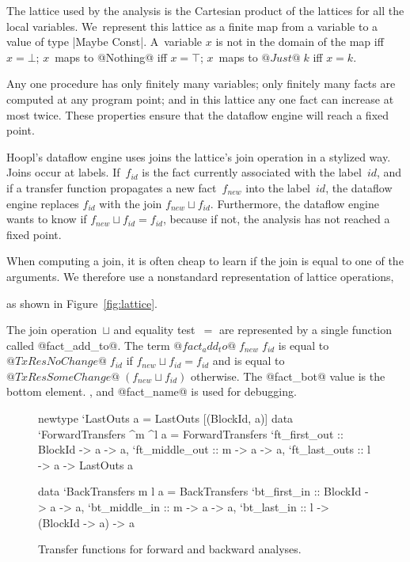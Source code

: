 \documentclass[blockstyle,preprint,natbib,nocopyrightspace]{sigplanconf}
\newcommand\ourlib{Hoopl}  %
\newcommand\join{\sqcup}
\newcommand\figref[1]{Figure~\ref{fig:#1}}
\newcommand\figlabel[1]{\label{fig:#1}}
\begin{document}
The lattice used by the analysis is the Cartesian product of the
lattices for all the local variables.
We~represent this lattice as a finite map from a variable
to a value of type \icode|Maybe Const|.
A~variable $x$ is not in the domain of the map iff $x=\bot$;
$x$~maps to @Nothing@ iff $x=\top$; $x$~maps to $@Just@\;k$ iff
$x=k$.


\ifcutting\else
Any one procedure has only finitely many variables;
only finitely many facts are computed at any program point;
and in this lattice any one fact can increase at most twice.
These properties
ensure that the dataflow engine will
reach a fixed point.
\fi


\ourlib's dataflow engine uses
\ifcutting joins
\else the lattice's join operation
\fi in a stylized way.
Joins occur at labels.
If~$f_{\mathit{id}}$ is the fact currently associated with the
label~$\mathit{id}$, 
and if a transfer function propagates a new fact~$f_{\mathit{new}}$
into the label~$\mathit{id}$, 
the dataflow engine replaces $f_{\mathit{id}}$ with
the join  $f_{\mathit{new}} \join f_{\mathit{id}}$.
Furthermore, the dataflow engine wants to know if
  $f_{\mathit{new}} \join f_{\mathit{id}} = f_{\mathit{id}}$,
because if not, the analysis has not reached a fixed point.



When computing a join, 
it is often cheap to learn if the join
is equal to one of the arguments.
We therefore use a nonstandard representation of lattice operations,
\iffalse
(\figref{lattice}).
\else
as shown in \figref{lattice}.
\fi
The join operation~$\join$ and equality test~$=$ are represented by a
single function called @fact_add_to@.
The term $@fact_add_to@\;f_{\mathit{new}}\;f_{\mathit{id}}$ is equal to
$@TxRes NoChange@\; f_{\mathit{id}}$ if $f_{\mathit{new}} \join f_{\mathit{id}} = f_{\mathit{id}}$
and is equal to
$@TxRes SomeChange@\; (f_{\mathit{new}} \join f_{\mathit{id}})$ otherwise.
The @fact_bot@ value is the bottom element\ifcutting.
\else, 
and @fact_name@  is used for debugging.
\fi

\begin{figure}
\begin{code}
newtype `LastOuts a = LastOuts [(BlockId, a)]
data `ForwardTransfers ^m ^l a = ForwardTransfers
 {`ft_first_out  :: BlockId -> a -> a,
  `ft_middle_out :: m       -> a -> a,
  `ft_last_outs  :: l       -> a -> LastOuts a} 

data `BackTransfers m l a = BackTransfers
 {`bt_first_in  :: BlockId -> a              -> a,
  `bt_middle_in :: m       -> a              -> a,
  `bt_last_in   :: l       -> (BlockId -> a) -> a} 
\end{code}
\caption{Transfer functions for forward and backward analyses.}
\figlabel{transfers}
\ifpagetuning\vspace*{-1ex}\fi
%
%
\end{figure}
\end{document}
